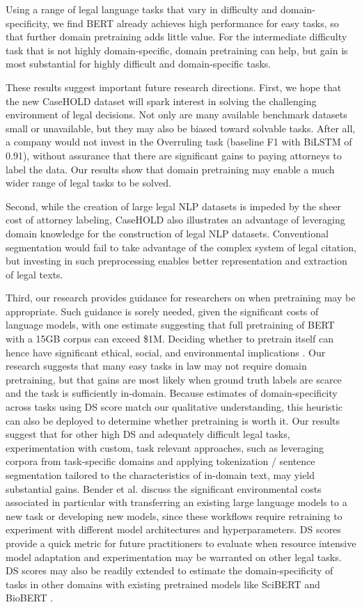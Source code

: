 \documentclass[sigconf]{acmart}
\begin{document}
Using a range of legal language tasks that vary in difficulty and domain-specificity, we find BERT already achieves high performance for easy tasks, so that further domain pretraining adds little value. For the intermediate difficulty task that is not highly domain-specific, domain pretraining can help, but gain is most substantial for highly difficult and domain-specific tasks.

These results suggest important future research directions.  First, we hope that the new CaseHOLD dataset will spark interest in solving the challenging environment of legal decisions.  Not only are many available benchmark datasets small or unavailable, but they may also be biased toward solvable tasks.  After all, a company would not invest in the Overruling task (baseline F1 with BiLSTM of 0.91), without assurance that there are significant gains to paying attorneys to label the data.  Our results show that domain pretraining may enable a much wider range of legal tasks to be solved.

Second, while the creation of large legal NLP datasets is impeded by the sheer cost of attorney labeling, CaseHOLD also illustrates an advantage of leveraging domain knowledge for the construction of legal NLP datasets.  Conventional segmentation would fail to take advantage of the complex system of legal citation, but investing in such preprocessing enables better representation and extraction of legal texts.

Third, our research provides guidance for researchers on when pretraining may be appropriate.  Such guidance is sorely needed, given the significant costs of language models, with one estimate suggesting that full  pretraining of BERT with a 15GB corpus can exceed \$1M.  Deciding whether to pretrain itself can hence have  significant ethical, social, and environmental implications \cite{Ben:Geb:McM:21}. Our research suggests that many easy tasks in law may not require domain pretraining, but that gains are most likely when ground truth labels are scarce and the task is sufficiently in-domain. Because estimates of domain-specificity across tasks using DS score match our qualitative understanding, this heuristic can also be deployed to determine whether pretraining is worth it. Our results suggest that for other high DS and adequately difficult legal tasks, experimentation with custom, task relevant approaches, such as leveraging corpora from task-specific domains and applying tokenization / sentence segmentation tailored to the characteristics of in-domain text, may yield substantial gains. Bender et al. \cite{Ben:Geb:McM:21} discuss the significant environmental costs associated in particular with transferring an existing large language models to a new task or developing new models, since these workflows require retraining to experiment with different model architectures and hyperparameters. DS scores provide a quick metric for future practitioners to evaluate when resource intensive model adaptation and experimentation may be warranted on other legal tasks. DS scores may also be readily extended to estimate the domain-specificity of tasks in other domains with existing pretrained models like SciBERT and BioBERT \cite{beltagy-etal-2019-scibert, lee_biobert_2019}.
\end{document}
